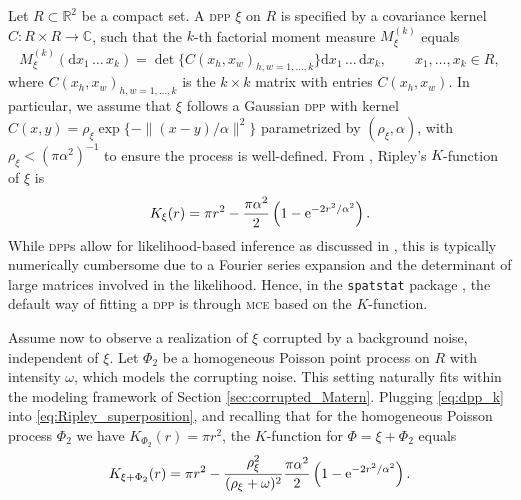 \documentclass[11pt,a4paper,oneside]{article}
\newcommand{\e}{{\rm e}}
\newcommand{\dd}{\mathrm d}
\theoremstyle{definition}
\theoremstyle{remark}
\begin{document}
Let $R \subset \mathbb R^2$ be a compact set. 
A \textsc{dpp} $\xi$ on $R$ is specified by a covariance kernel $C: R \times R \rightarrow \mathbb C$, such that the $k$-th factorial moment measure $M_{\xi}^{(k)}$ equals
\[
    M_{\xi}^{(k)}(\dd x_1\, \ldots\, x_k) = \det\{C(x_h, x_w)_{h,w = 1,\ldots,k}\} \dd x_1\,\ldots\, \dd x_k, \qquad x_1, \ldots, x_k \in R,
\]
where $C(x_h, x_w)_{h,w = 1,\ldots,k}$ is the $k \times k$ matrix with entries $C(x_h, x_w)$. In particular, we assume that $\xi$ follows a Gaussian \textsc{dpp} \citep{Lavancier2015} with kernel $C(x, y) = \rho_\xi \exp\{-\| (x - y) / \alpha \|^2 \}$ parametrized by $(\rho_\xi, \alpha)$, with $\rho_\xi < (\pi \alpha^2)^{-1}$ to ensure the process is well-defined.
From \cite{Lavancier2015}, Ripley's $K$-function of $\xi$ is
\begin{equation}\label{eq:dpp_k}
    K_{\xi}(r) = \pi r^2 - \frac{\pi \alpha^2}{2}\left(1 - \e^{-2r^2/\alpha^2}\right).
\end{equation}
While \textsc{dpp}s allow for likelihood-based inference as discussed in \cite{Lavancier2015}, this is typically numerically cumbersome due to a Fourier series expansion and the determinant of large matrices involved in the likelihood. 
Hence, in the \texttt{spatstat} package \citep{BaddeleyTurner2005}, the default way of fitting a \textsc{dpp} is through \textsc{mce} based on the $K$-function.

Assume now to observe a realization of $\xi$ corrupted by a background noise, independent of $\xi$. Let $\Phi_2$ be a homogeneous Poisson point process on $R$ with intensity $\omega$, which models the corrupting noise.
This setting naturally fits within the modeling framework of Section \ref{sec:corrupted_Matern}.
Plugging \eqref{eq:dpp_k} into \eqref{eq:Ripley_superposition}, and recalling that for the homogeneous Poisson process $\Phi_2$ we have $K_{\Phi_2}(r) = \pi r^2$, the $K$-function for $\Phi = \xi + \Phi_2$ equals
\begin{equation}\label{eq:noisy_K}
    K_{\xi + \Phi_2}(r) = \pi r^2 - \frac{\rho_\xi^2}{(\rho_\xi + \omega)^2} \frac{\pi \alpha^2}{2} \left(1 - \e^{-2r^2/\alpha^2}\right).
\end{equation}
\end{document}
